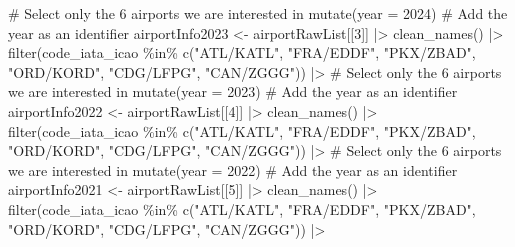 \documentclass[
  letterpaper,
  DIV=11,
  numbers=noendperiod]{scrartcl}
\newenvironment{Shaded}{\begin{snugshade}}{\end{snugshade}}
\newcommand{\AttributeTok}[1]{\textcolor[rgb]{0.40,0.45,0.13}{#1}}
\newcommand{\CommentTok}[1]{\textcolor[rgb]{0.37,0.37,0.37}{#1}}
\newcommand{\DecValTok}[1]{\textcolor[rgb]{0.68,0.00,0.00}{#1}}
\newcommand{\FunctionTok}[1]{\textcolor[rgb]{0.28,0.35,0.67}{#1}}
\newcommand{\NormalTok}[1]{\textcolor[rgb]{0.00,0.23,0.31}{#1}}
\newcommand{\OtherTok}[1]{\textcolor[rgb]{0.00,0.23,0.31}{#1}}
\newcommand{\SpecialCharTok}[1]{\textcolor[rgb]{0.37,0.37,0.37}{#1}}
\newcommand{\StringTok}[1]{\textcolor[rgb]{0.13,0.47,0.30}{#1}}
\begin{document}
\begin{Shaded}
\begin{Highlighting}[]
  \CommentTok{\# Select only the 6 airports we are interested in}
  \FunctionTok{mutate}\NormalTok{(}\AttributeTok{year =} \DecValTok{2024}\NormalTok{) }\CommentTok{\# Add the year as an identifier}
\NormalTok{airportInfo2023 }\OtherTok{\textless{}{-}}\NormalTok{ airportRawList[[}\DecValTok{3}\NormalTok{]] }\SpecialCharTok{|\textgreater{}}
  \FunctionTok{clean\_names}\NormalTok{() }\SpecialCharTok{|\textgreater{}}
  \FunctionTok{filter}\NormalTok{(}\StringTok{\textasciigrave{}}\AttributeTok{code\_iata\_icao}\StringTok{\textasciigrave{}} \SpecialCharTok{\%in\%} \FunctionTok{c}\NormalTok{(}\StringTok{"ATL/KATL"}\NormalTok{, }\StringTok{"FRA/EDDF"}\NormalTok{, }\StringTok{"PKX/ZBAD"}\NormalTok{,}
                                 \StringTok{"ORD/KORD"}\NormalTok{, }\StringTok{"CDG/LFPG"}\NormalTok{, }\StringTok{"CAN/ZGGG"}\NormalTok{)) }\SpecialCharTok{|\textgreater{}} 
  \CommentTok{\# Select only the 6 airports we are interested in}
  \FunctionTok{mutate}\NormalTok{(}\AttributeTok{year =} \DecValTok{2023}\NormalTok{) }\CommentTok{\# Add the year as an identifier}
\NormalTok{airportInfo2022 }\OtherTok{\textless{}{-}}\NormalTok{ airportRawList[[}\DecValTok{4}\NormalTok{]] }\SpecialCharTok{|\textgreater{}}
  \FunctionTok{clean\_names}\NormalTok{() }\SpecialCharTok{|\textgreater{}}
  \FunctionTok{filter}\NormalTok{(}\StringTok{\textasciigrave{}}\AttributeTok{code\_iata\_icao}\StringTok{\textasciigrave{}} \SpecialCharTok{\%in\%} \FunctionTok{c}\NormalTok{(}\StringTok{"ATL/KATL"}\NormalTok{, }\StringTok{"FRA/EDDF"}\NormalTok{, }\StringTok{"PKX/ZBAD"}\NormalTok{,}
                                 \StringTok{"ORD/KORD"}\NormalTok{, }\StringTok{"CDG/LFPG"}\NormalTok{, }\StringTok{"CAN/ZGGG"}\NormalTok{)) }\SpecialCharTok{|\textgreater{}} 
  \CommentTok{\# Select only the 6 airports we are interested in}
  \FunctionTok{mutate}\NormalTok{(}\AttributeTok{year =} \DecValTok{2022}\NormalTok{) }\CommentTok{\# Add the year as an identifier}
\NormalTok{airportInfo2021 }\OtherTok{\textless{}{-}}\NormalTok{ airportRawList[[}\DecValTok{5}\NormalTok{]] }\SpecialCharTok{|\textgreater{}}
  \FunctionTok{clean\_names}\NormalTok{() }\SpecialCharTok{|\textgreater{}}
  \FunctionTok{filter}\NormalTok{(}\StringTok{\textasciigrave{}}\AttributeTok{code\_iata\_icao}\StringTok{\textasciigrave{}} \SpecialCharTok{\%in\%} \FunctionTok{c}\NormalTok{(}\StringTok{"ATL/KATL"}\NormalTok{, }\StringTok{"FRA/EDDF"}\NormalTok{, }\StringTok{"PKX/ZBAD"}\NormalTok{,}
                                 \StringTok{"ORD/KORD"}\NormalTok{, }\StringTok{"CDG/LFPG"}\NormalTok{, }\StringTok{"CAN/ZGGG"}\NormalTok{)) }\SpecialCharTok{|\textgreater{}} 

\end{Highlighting}
\end{Shaded}
\end{document}
